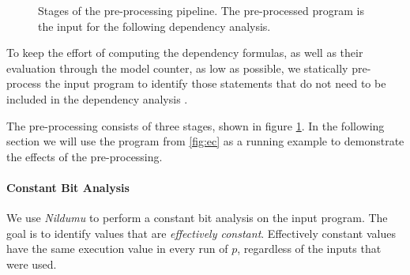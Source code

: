 \begin{figure}
    \centering
    \caption{Stages of the pre-processing pipeline. The pre-processed program is the input for the following dependency analysis.}
    \label{fig:pp}
\end{figure}

To keep the effort of computing the dependency formulas, as well as their evaluation through the model counter, as low as possible, we statically pre-process the input program to identify those statements that do not need to be included in the dependency analysis .

The pre-processing consists of three stages, shown in figure \ref{fig:pp}. In the following section we will use the program from \ref{fig:ec} as a running example to demonstrate the effects of the pre-processing.

\paragraph{Constant Bit Analysis}
We use \emph{Nildumu} \cite{bechberger18} to perform a constant bit analysis on the input program. The goal is to identify values that are \emph{effectively constant}. Effectively constant values have the same execution value in every run of $p$, regardless of the inputs that were used.

